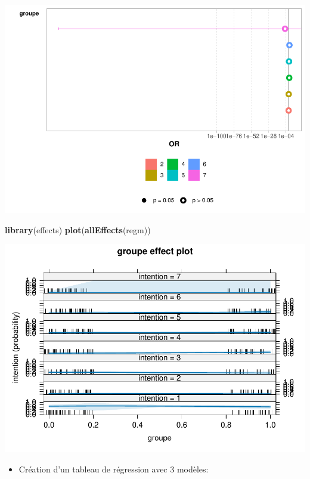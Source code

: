 \documentclass[
]{article}
\newenvironment{Shaded}{\begin{snugshade}}{\end{snugshade}}
\newcommand{\FunctionTok}[1]{\textcolor[rgb]{0.13,0.29,0.53}{\textbf{#1}}}
\newcommand{\NormalTok}[1]{#1}
\providecommand{\tightlist}{%
  \setlength{\itemsep}{0pt}\setlength{\parskip}{0pt}}
\begin{document}
\includegraphics{RMarkdown_files/figure-latex/unnamed-chunk-31-1.pdf}

\begin{Shaded}
\begin{Highlighting}[]
\FunctionTok{library}\NormalTok{(effects)}
\FunctionTok{plot}\NormalTok{(}\FunctionTok{allEffects}\NormalTok{(regm))}
\end{Highlighting}
\end{Shaded}

\includegraphics{RMarkdown_files/figure-latex/unnamed-chunk-31-2.pdf}

\begin{itemize}
\tightlist
\item
  Création d'un tableau de régression avec 3 modèles:
\end{itemize}
\end{document}
